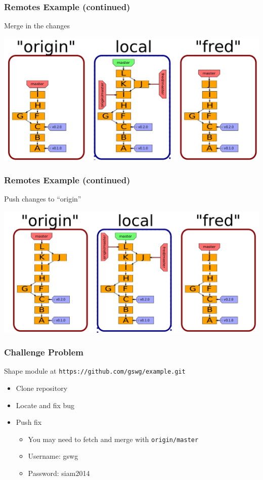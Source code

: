 \documentclass[english,compress]{beamer}
\begin{document}
\begin{frame}[fragile]
    \frametitle{Remotes Example (continued)}
	Merge in the changes

	\begin{center}
		\includegraphics[width=.8\textwidth]{figs/merge-fred}
	\end{center}
\end{frame}

\begin{frame}[fragile]
    \frametitle{Remotes Example (continued)}
	Push changes to ``origin''

	\begin{center}
		\includegraphics[width=.8\textwidth]{figs/push-fred}
	\end{center}
\end{frame}

\begin{frame}[fragile]
    \frametitle{Challenge Problem}

    Shape module at \verb|https://github.com/gswg/example.git|
    \begin{itemize}
        \item Clone repository
        \item Locate and fix bug
        \item Push fix
            \begin{itemize}
                \item You may need to fetch and merge with \verb|origin/master|
                \item Username: gswg
                \item Password: siam2014
            \end{itemize}
    \end{itemize}
\end{frame}
\end{document}
